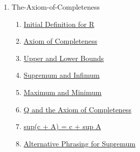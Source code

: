 \clearpage
\renewcommand{\notetitle}{Table of Contents}
\label{toc}
\begin{enumerate}

\item The-Axiom-of-Completeness
\begin{enumerate}
\item \hyperref[202501180703]{Initial Definition for R}
\item \hyperref[202501180727]{Axiom of Completeness}
\item \hyperref[202501180734]{Upper and Lower Bounds}
\item \hyperref[202501180743]{Supremum and Infimum}
\item \hyperref[202501181241]{Maximum and Minimum}
\item \hyperref[202501181257]{Q and the Axiom of Completeness}
\item \hyperref[202501181310]{sup(c + A) = c + sup A}
\item \hyperref[202501181335]{Alternative Phrasing for Supremum}
\end{enumerate}
\end{enumerate}

\newpage
